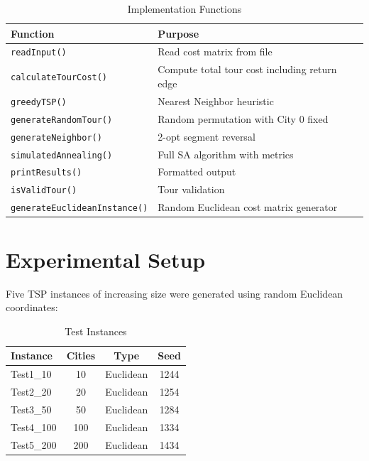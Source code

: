 \documentclass[12pt,a4paper]{article}
\begin{document}
\begin{table}[H]
\centering
\caption{Implementation Functions}
\begin{tabular}{@{}ll@{}}
\toprule
\textbf{Function} & \textbf{Purpose} \\
\midrule
\texttt{readInput()} & Read cost matrix from file \\
\texttt{calculateTourCost()} & Compute total tour cost including return edge \\
\texttt{greedyTSP()} & Nearest Neighbor heuristic \\
\texttt{generateRandomTour()} & Random permutation with City 0 fixed \\
\texttt{generateNeighbor()} & 2-opt segment reversal \\
\texttt{simulatedAnnealing()} & Full SA algorithm with metrics \\
\texttt{printResults()} & Formatted output \\
\texttt{isValidTour()} & Tour validation \\
\texttt{generateEuclideanInstance()} & Random Euclidean cost matrix generator \\
\bottomrule
\end{tabular}
\end{table}

\section{Experimental Setup}

Five TSP instances of increasing size were generated using random Euclidean coordinates:

\begin{table}[H]
\centering
\caption{Test Instances}
\begin{tabular}{@{}lccc@{}}
\toprule
\textbf{Instance} & \textbf{Cities} & \textbf{Type} & \textbf{Seed} \\
\midrule
Test1\_10 & 10 & Euclidean & 1244 \\
Test2\_20 & 20 & Euclidean & 1254 \\
Test3\_50 & 50 & Euclidean & 1284 \\
Test4\_100 & 100 & Euclidean & 1334 \\
Test5\_200 & 200 & Euclidean & 1434 \\
\bottomrule
\end{tabular}
\end{table}
\end{document}
